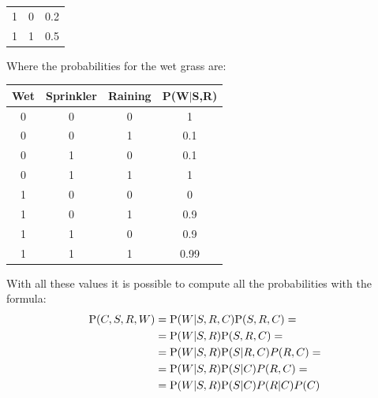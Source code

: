 \begin{example}
\begin{table}[H]
\begin{tabular}{ccc}
        1       & 0      & 0.2    \\
        1       & 1      & 0.5    \\ \hline
        \end{tabular}
    \end{table}
    Where the probabilities for the wet grass are: 
    \begin{table}[H]
        \centering
        \begin{tabular}{cccc}
        \hline
        \textbf{Wet} & \textbf{Sprinkler} & \textbf{Raining} & \textbf{P(W$|$S,R)} \\ \hline
        0            & 0                  & 0                & 1                   \\
        0            & 0                  & 1                & 0.1                 \\
        0            & 1                  & 0                & 0.1                 \\
        0            & 1                  & 1                & 1                   \\
        1            & 0                  & 0                & 0                   \\
        1            & 0                  & 1                & 0.9                 \\
        1            & 1                  & 0                & 0.9                 \\
        1            & 1                  & 1                & 0.99                \\ \hline
        \end{tabular}
    \end{table}
    With all these values it is possible to compute all the probabilities with the formula: 
    \[
    \begin{aligned}
        \textnormal{P}(C,S,R,W)     &= \textnormal{P}(W|S,R,C)\textnormal{P}(S,R,C)=      \\
                                    &= \textnormal{P}(W|S,R)\textnormal{P}(S,R,C)=        \\
                                    &= \textnormal{P}(W|S,R)\textnormal{P}(S|R,C)P(R,C)=  \\
                                    &= \textnormal{P}(W|S,R)\textnormal{P}(S|C)P(R,C)=    \\
                                    &= \textnormal{P}(W|S,R)\textnormal{P}(S|C)P(R|C)P(C)
    \end{aligned}
\]
\end{example}
